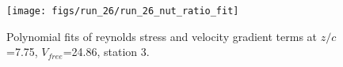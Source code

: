 \begin{figure}[H]
\centering
\texttt{[image: figs/run\_26/run\_26\_nut\_ratio\_fit]}
\caption{Polynomial fits of reynolds stress and velocity gradient terms at $z/c$=7.75, $V_{free}$=24.86, station 3.}
\label{fig:run_26_nut_ratio_fit}
\end{figure}


